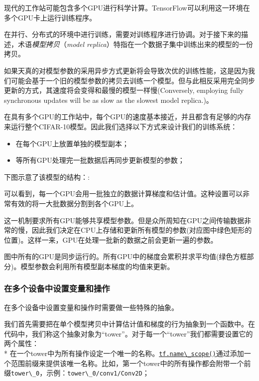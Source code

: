 现代的工作站可能包含多个GPU进行科学计算。TensorFlow可以利用这一环境在多个GPU卡上运行训练程序。

在并行、分布式的环境中进行训练，需要对训练程序进行协调。对于接下来的描述，术语\emph{模型拷贝}（\emph{model
replica}）特指在一个数据子集中训练出来的模型的一份拷贝。

如果天真的对模型参数的采用异步方式更新将会导致次优的训练性能，这是因为我们可能会基于一个旧的模型参数的拷贝去训练一个模型。但与此相反采用完全同步更新的方式，其速度将会变得和最慢的模型一样慢(Conversely,
employing fully synchronous updates will be as slow as the slowest model
replica.)。

在具有多个GPU的工作站中，每个GPU的速度基本接近，并且都含有足够的内存来运行整个CIFAR-10模型。因此我们选择以下方式来设计我们的训练系统：

\begin{itemize}
\item
  在每个GPU上放置单独的模型副本；
\item
  等所有GPU处理完一批数据后再同步更新模型的参数；
\end{itemize}

下图示意了该模型的结构：:

可以看到，每一个GPU会用一批独立的数据计算梯度和估计值。这种设置可以非常有效的将一大批数据分割到各个GPU上。

这一机制要求所有GPU能够共享模型参数。但是众所周知在GPU之间传输数据非常的慢，因此我们决定在CPU上存储和更新所有模型的参数(对应图中绿色矩形的位置)。这样一来，GPU在处理一批新的数据之前会更新一遍的参数。

图中所有的GPU是同步运行的。所有GPU中的梯度会累积并求平均值(绿色方框部分)。模型参数会利用所有模型副本梯度的均值来更新。

\subsubsection{在多个设备中设置变量和操作}\label{ux5728ux591aux4e2aux8bbeux5907ux4e2dux8bbeux7f6eux53d8ux91cfux548cux64cdux4f5c}

在多个设备中设置变量和操作时需要做一些特殊的抽象。

我们首先需要把在单个模型拷贝中计算估计值和梯度的行为抽象到一个函数中。在代码中，我们称这个抽象对象为``tower''。对于每一个``tower''我们都需要设置它的两个属性：\\
*
在一个tower中为所有操作设定一个唯一的名称。\href{https://github.com/jikexueyuanwiki/tensorflow-zh/blob/master/SOURCE/api_docs/python/framework.md\#name_scope}{\lstinline{tf.name\_scope()}}通过添加一个范围前缀来提供该唯一名称。比如，第一个tower中的所有操作都会附带一个前缀\lstinline{tower\_0}，示例：\lstinline{tower\_0/conv1/Conv2D}；

